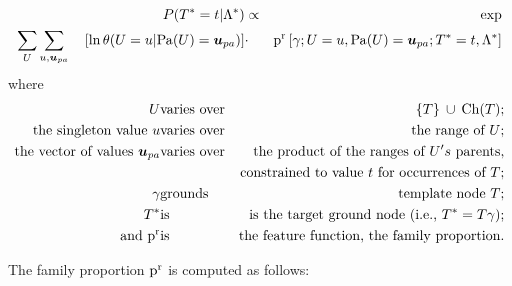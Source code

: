 \documentclass[runningheads,a4paper]{llncs}
\renewcommand{\Qconj}{\Appendterm{\FG{\TT} = \TV} {\QC}} %
\begin{document}
%
\begin{definition}\label{def:log-diff-freq-eq}
\begin{eqnarray}
  \Gprob{\FG{{\TT}} = \TV} {\QC} &\propto &  \exp\\
  \notag
 \sum_{\UT} \sum_{\UV,\Prange{\UT}}   \quad \left[ \ln \cprob{\UT = \UV}{\Pa{\UT} = \Prange{\UT}} \right] &
    \cdot &
    \Relfreq{\Appendterm{\grounding;\UT  = \UV} {\Pa{\UT} = \Prange{\UT}}} {\Qconj}
\end{eqnarray}
where 
\begin{eqnarray*}
\UT &\mathrm{varies\ over} & \Setaddterm{\{\TT\}} {\Ch{\TT}}; \\
\mbox{the singleton value} \ \UV & \mathrm{varies\ over} & \mbox{the range of}\  \UT;\\
\mbox{the vector of values} \ \Prange{\UT} & \mathrm{varies\ over} & \mbox{the product of the ranges of} \ \UT's\ \mbox{parents}, \\
& & \mbox{constrained to value} \ \TV \ \mbox{for occurrences of} \ \TT;\\
\grounding &\mathrm{grounds}& \mbox{template node }\TT;\\
\FG{\TT} &\mathrm{is} & \mbox{is the target ground node (i.e., } \FG{\TT} = \TT \grounding); \\
\mbox{and}~\Relevant{\Fvar} &\mathrm{is} & \mbox{the feature function, the family proportion}.
\end{eqnarray*}
\end{definition}
\newpage
The family proportion $\mathrm{p}^{\mathrm{r}}$ is computed as follows:
\end{document}
